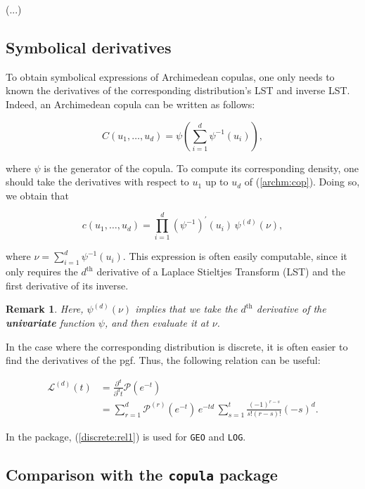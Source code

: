 \documentclass[11pt, english]{article}\usepackage[]{graphicx}\usepackage[]{color}
\newtheorem{rem}{Remark}
\begin{document}
(...)

\subsection{Symbolical derivatives}

To obtain symbolical expressions of Archimedean copulas, one only needs to known the derivatives of the corresponding distribution's LST and inverse LST. Indeed, an Archimedean copula can be written as follows:

\begin{equation}\label{archm:cop}
  C(u_1, \ldots, u_d) = \psi \left( \sum_{i = 1}^d \psi^{-1}(u_i) \right),
\end{equation}

where $\psi$ is the generator of the copula. To compute its corresponding density, one should take the  derivatives with respect to $u_1$ up to $u_d$ of (\ref{archm:cop}). Doing so, we obtain that

\begin{equation}
  c(u_1, \ldots, u_d) = \prod_{i = 1}^d \left(\psi^{-1}\right)^\prime (u_i) \, \psi^{(d)}(\nu),
\end{equation}

where $\nu = \sum_{i = 1}^d \psi^{-1}(u_i)$. This expression is often easily computable, since it only requires the $d^{\text{th}}$ derivative of a Laplace Stieltjes Transform (LST) and the first derivative of its inverse.

\begin{rem} Here, $\psi^{(d)}(\nu)$ implies that we take the $d^\text{th}$ derivative of the \textbf{univariate} function $\psi$, and then evaluate it at $\nu$.
\end{rem}

In the case where the corresponding distribution is discrete, it is often easier to find the derivatives of the pgf. Thus, the following relation can be useful:

\begin{align}\label{discrete:rel1}
  \mathcal{L}^{(d)}(t) &= \frac{\partial^d}{\partial^d t} \mathcal{P} \left(e^{-t}\right) \nonumber \\
  &= \sum_{r = 1}^d \mathcal{P}^{(r)}\left(e^{-t}\right) \, e^{-td} \, \sum_{s = 1}^t \frac{(-1)^{r - s}}{s! (r - s)!} (-s)^d.
\end{align}

In the package, (\ref{discrete:rel1}) is used for \texttt{GEO} and \texttt{LOG}.

\subsection{Comparison with the \texttt{copula} package}
\end{document}
